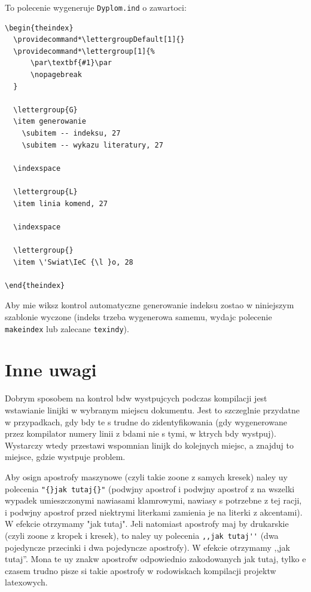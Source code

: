 \begin{itemize}
To polecenie wygeneruje \texttt{Dyplom.ind} o zawartoci:
\begin{lstlisting}[basicstyle=\footnotesize\ttfamily]
\begin{theindex}
  \providecommand*\lettergroupDefault[1]{}
  \providecommand*\lettergroup[1]{%
      \par\textbf{#1}\par
      \nopagebreak
  }

  \lettergroup{G}
  \item generowanie
    \subitem -- indeksu, 27
    \subitem -- wykazu literatury, 27

  \indexspace

  \lettergroup{L}
  \item linia komend, 27

  \indexspace

  \lettergroup{}
  \item \'Swiat\IeC {\l }o, 28

\end{theindex}
\end{lstlisting}


\end{itemize}


Aby mie wiksz kontrol automatyczne generowanie indeksu zostao w niniejszym szablonie wyczone (indeks trzeba wygenerowa samemu, wydajc polecenie \texttt{makeindex} lub zalecane \texttt{texindy}).

\section{Inne uwagi}
Dobrym sposobem na kontrol bdw wystpujcych podczas kompilacji jest wstawianie linijki \verb?? w wybranym miejscu dokumentu. Jest to szczeglnie przydatne w przypadkach, gdy bdy te s trudne do zidentyfikowania (gdy wygenerowane przez kompilator numery linii z bdami nie s tymi, w ktrych bdy wystpuj). Wystarczy wtedy przestawi wspomnian linijk do kolejnych miejsc, a znajduj to miejsce, gdzie wystpuje problem.

Aby osign apostrofy maszynowe (czyli takie zoone z samych kresek) naley uy polecenia \verb?"{}jak tutaj{}"? (podwjny apostrof i podwjny apostrof z na wszelki wypadek umieszczonymi nawiasami klamrowymi, nawiasy s potrzebne z tej racji, i podwjny apostrof przed niektrymi literkami zamienia je na literki z akcentami). W efekcie otrzymamy "{}jak tutaj{}". Jeli natomiast apostrofy maj by drukarskie (czyli zoone z kropek i kresek), to naley uy polecenia \verb?,,jak tutaj''? (dwa pojedyncze przecinki i dwa pojedyncze apostrofy). W efekcie otrzymamy ,,jak tutaj''. Mona te uy znakw apostrofw odpowiednio zakodowanych jak tutaj, tylko e czasem trudno pisze si takie apostrofy w rodowiskach kompilacji projektw latexowych.


